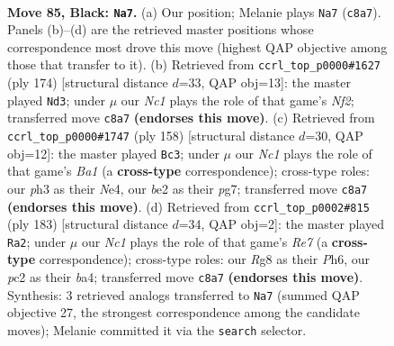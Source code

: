 \documentclass[11pt]{article}
\begin{document}
\clearpage

\begin{figure}[p]\centering
\begin{subfigure}{0.46\textwidth}\centering
\resizebox{\linewidth}{!}{%
\newchessgame
\chessboard[
  setfen={2n3r1/8/P2k4/8/4K3/2R3PP/2P1B3/8 b - - 4 85},
  showmover=false,
  pgfstyle=straightmove, color=movearrow, markmove={c8-a7}
]}
\caption{}
\end{subfigure}\hfill
\begin{subfigure}{0.46\textwidth}\centering
\resizebox{\linewidth}{!}{%
\newchessgame
\chessboard[
  setfen={8/8/8/5r1p/8/pk4K1/5N2/7R w - - 0 88},
  showmover=false,
  pgfstyle=straightmove, color=movearrow, markmove={f2-d3}
]}
\caption{}
\end{subfigure}
\\[4pt]
\begin{subfigure}{0.46\textwidth}\centering
\resizebox{\linewidth}{!}{%
\newchessgame
\chessboard[
  setfen={8/6p1/6k1/p1p1K3/4N3/r7/2p5/B1R5 w - - 4 80},
  showmover=false,
  pgfstyle=straightmove, color=movearrow, markmove={a1-c3}
]}
\caption{}
\end{subfigure}\hfill
\begin{subfigure}{0.46\textwidth}\centering
\resizebox{\linewidth}{!}{%
\newchessgame
\chessboard[
  setfen={8/6p1/7p/4k3/B2n4/P1R4P/4r3/3K4 b - - 6 92},
  showmover=false,
  pgfstyle=straightmove, color=movearrow, markmove={e2-a2}
]}
\caption{}
\end{subfigure}
\caption{\textbf{Move 85, Black: \texttt{Na7}.} (a) Our position; Melanie plays \texttt{Na7} (\texttt{c8a7}). Panels (b)--(d) are the retrieved master positions whose correspondence most drove this move (highest QAP objective among those that transfer to it). (b) Retrieved from \texttt{ccrl\_top\_p0000\#1627} (ply 174) [structural distance $d$=33, QAP obj=13]: the master played \texttt{Nd3}; under $\mu$ our \emph{Nc1} plays the role of that game's \emph{Nf2}; transferred move \texttt{c8a7} \textbf{(endorses this move)}. (c) Retrieved from \texttt{ccrl\_top\_p0000\#1747} (ply 158) [structural distance $d$=30, QAP obj=12]: the master played \texttt{Bc3}; under $\mu$ our \emph{Nc1} plays the role of that game's \emph{Ba1} (a \textbf{cross-type} correspondence); cross-type roles: our \emph{p}h3 as their \emph{N}e4, our \emph{b}e2 as their \emph{p}g7; transferred move \texttt{c8a7} \textbf{(endorses this move)}. (d) Retrieved from \texttt{ccrl\_top\_p0002\#815} (ply 183) [structural distance $d$=34, QAP obj=2]: the master played \texttt{Ra2}; under $\mu$ our \emph{Nc1} plays the role of that game's \emph{Re7} (a \textbf{cross-type} correspondence); cross-type roles: our \emph{R}g8 as their \emph{P}h6, our \emph{p}c2 as their \emph{b}a4; transferred move \texttt{c8a7} \textbf{(endorses this move)}. Synthesis: 3 retrieved analogs transferred to \texttt{Na7} (summed QAP objective 27, the strongest correspondence among the candidate moves); Melanie committed it via the \texttt{search} selector.}
\label{fig:thought-m169}
\end{figure}
\end{document}
